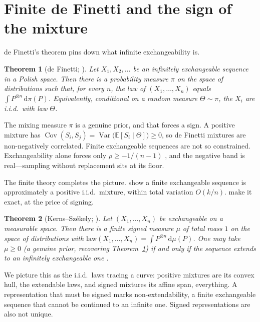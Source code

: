 \documentclass[11pt]{article}
\newtheorem{theorem}{Theorem}
\begin{document}
\section{Finite de Finetti and the sign of the mixture}

de Finetti's theorem pins down what infinite exchangeability is.

\begin{theorem}[de Finetti; \citealp{definetti1937,hewitt1955}]\label{thm:definetti}
Let $X_1,X_2,\dots$ be an infinitely exchangeable sequence in a Polish space. Then there is a
probability measure $\pi$ on the space of distributions such that, for every $n$, the law of
$(X_1,\dots,X_n)$ equals $\int P^{\otimes n}\,\mathrm{d}\pi(P)$. Equivalently, conditional on a
random measure $\Theta\sim\pi$, the $X_i$ are i.i.d.\ with law $\Theta$.
\end{theorem}

The mixing measure $\pi$ is a genuine prior, and that forces a sign. A positive mixture has
$\operatorname{Cov}(S_i,S_j)=\operatorname{Var}\big(\mathbb E[S_i\mid\Theta]\big)\ge 0$, so de
Finetti mixtures are non-negatively correlated. Finite exchangeable sequences are not so
constrained. Exchangeability alone forces only $\rho\ge -1/(n-1)$ \citep{aldous1985}, and the
negative band is real---sampling without replacement sits at its floor.

The finite theory completes the picture. \citet{diaconis1980} show a finite exchangeable
sequence is approximately a positive i.i.d.\ mixture, within total variation $O(k/n)$.
\citet{kerns2006} make it exact, at the price of signing.

\begin{theorem}[Kerns--Sz\'ekely; \citealp{kerns2006}]\label{thm:signed}
Let $(X_1,\dots,X_n)$ be exchangeable on a measurable space. Then there is a finite
signed measure $\mu$ of total mass $1$ on the space of distributions with
$\mathrm{law}(X_1,\dots,X_n)=\int P^{\otimes n}\,\mathrm{d}\mu(P)$. One may take $\mu\ge 0$ (a
genuine prior, recovering Theorem~\ref{thm:definetti}) if and only if the sequence extends to an
infinitely exchangeable one \citep{leonetti2018}.
\end{theorem} We picture this as the i.i.d.\ laws tracing a curve: positive mixtures are its convex hull, the
extendable laws, and signed mixtures its affine span, everything. A representation that must be
signed marks non-extendability, a finite exchangeable sequence that cannot be continued to an
infinite one. Signed representations are also not unique.
\end{document}

